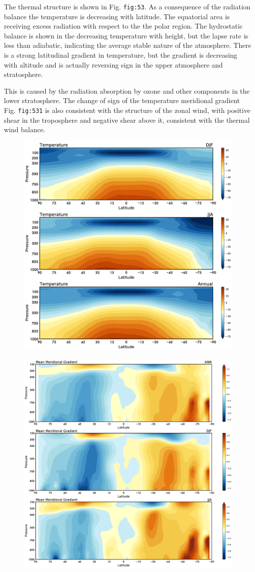 The thermal structure is shown in Fig. \texttt{fig:53}. As a consequence
of the radiation balance the temperature is decreasing with latitude.
The equatorial area is receiving excess radiation with respect to the
the polar region. The hydrostatic balance is shown in the decreasing
temperature with height, but the lapse rate is less than adiabatic,
indicating the average stable nature of the atmosphere. There is a
strong latitudinal gradient in temperature, but the gradient is
decreasing with altitude and is actually reversing sign in the upper
atmosphere and stratosphere.

This is caused by the radiation absorption by ozone and other components
in the lower stratosphere. The change of sign of the temperature
meridional gradient Fig. \texttt{fig:531} is also consistent with the
structure of the zonal wind, with positive shear in the troposphere and
negative shear above it, consistent with the thermal wind balance.

\begin{figure}
\centering
\includegraphics[width = .7 \textwidth]{figs/GD/Tzonal.png}
\caption{}\label{}
\end{figure}

\begin{figure}
\centering
\includegraphics[width = .7 \textwidth]{figs/GD/Tgradient.png}
\caption{}\label{}
\end{figure}

